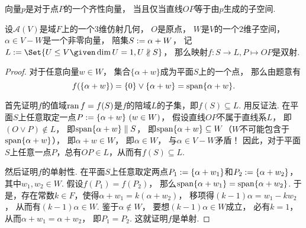 \begin{property}
向量\(p\)是对于点\(P\)的一个齐性向量，
当且仅当直线\(OP\)等于由\(p\)生成的子空间.
\end{property}

\begin{property}
设\(\mathcal{A}(V)\)是域\(F\)上的一个\(3\)维仿射几何，
\(O\)是原点，
\(W\)是\(V\)的一个\(2\)维子空间，
\(\alpha \in V - W\)是一个非零向量，
陪集\(S := \alpha + W\)，
记\(  %
	L
	\defeq
	\Set{
		U \AlgebraSubstructure V
		\given
		\dim U = 1,
		U \nparallel S
	}
\)，
那么映射\(
	f\colon S \to L,
	P \mapsto OP
\)是双射.
\begin{proof}
对于任意向量\(w \in W\)，
集合\(\{\alpha + w\}\)成为平面\(S\)上的一个点，
那么由题意有\begin{equation*}
	f(\{\alpha + w\})
	= \{0\} \vee \{\alpha + w\}
	= \operatorname{span}\{\alpha + w\}.
\end{equation*}

首先证明\(f\)的值域\(\operatorname{ran} f = f(S)\)是\(f\)的陪域\(L\)的子集，即\(f(S) \subseteq L\).
用反证法.
在平面\(S\)上任意取定一点\(P := \{\alpha + w\}\ (w \in W)\)，
假设直线\(OP\)不属于直线系\(L\)，
即\((O \vee P) \notin L\)，
即\(\operatorname{span}\{\alpha + w\} \parallel S\)，
即\(\operatorname{span}\{\alpha + w\} \subseteq W\)（\(W\)不可能包含于\(\operatorname{span}\{\alpha + w\}\)），
即\(\alpha + w \in W\)，
即\(\alpha \in W\)，
与\(\alpha \in V - W\)矛盾！
因此，对于平面\(S\)上任意一点\(P\)，总有\(OP \in L\)，从而有\(f(S) \subseteq L\).

然后证明\(f\)的单射性.
在平面\(S\)上任意取定两点\(P_1 := \{\alpha + w_1\}\)和\(P_2 := \{\alpha + w_2\}\)，
其中\(w_1,w_2 \in W\).
假设\(f(P_1) = f(P_2)\)，
那么\(\operatorname{span}\{\alpha + w_1\} = \operatorname{span}\{\alpha + w_2\}\).
于是，存在常数\(k \in F\)，使得\(\alpha + w_1 = k (\alpha + w_2)\)，
移项得\((k-1) \alpha = w_1 - k w_2\)，
从而有\((k-1) \alpha \in W\).
鉴于\(\alpha \notin W\)，
要想\((k-1) \alpha \in W\)成立，
必有\(k = 1\)，
从而\(\alpha + w_1 = \alpha + w_2\)，
即\(P_1 = P_2\).
这就证明\(f\)是单射.


\end{proof}
\end{property}
